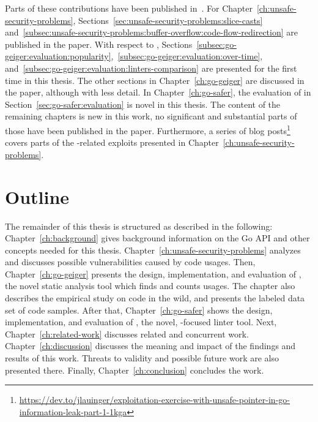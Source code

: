 Parts of these contributions have been published in~\cite{lauinger2020}.
For Chapter~\ref{ch:unsafe-security-problems}, Sections~\ref{sec:unsafe-security-problems:slice-casts}
and~\ref{subsec:unsafe-security-problems:buffer-overflow:code-flow-redirection} are published in the paper.
With respect to \toolGeiger{}, Sections~\ref{subsec:go-geiger:evaluation:popularity},~\ref{subsec:go-geiger:evaluation:over-time},
and~\ref{subsec:go-geiger:evaluation:linters-comparison} are presented for
the first time in this thesis.
The other sections in Chapter~\ref{ch:go-geiger} are discussed in the paper, although with less detail.
In Chapter~\ref{ch:go-safer}, the evaluation of \toolSafer{} in Section~\ref{sec:go-safer:evaluation} is novel in this
thesis.
The content of the remaining chapters is new in this work, no significant and substantial parts of those have been
published in the paper.
Furthermore, a series of blog
posts\footnote{\url{https://dev.to/jlauinger/exploitation-exercise-with-unsafe-pointer-in-go-information-leak-part-1-1kga}}
covers parts of the \unsafe{}-related exploits presented in Chapter~\ref{ch:unsafe-security-problems}.



\section{Outline}\label{sec:introduction:outline}

The remainder of this thesis is structured as described in the following: Chapter~\ref{ch:background} gives background
information on the Go \unsafe{} \acrshort{API} and other concepts needed for this thesis.
Chapter~\ref{ch:unsafe-security-problems} analyzes and discusses possible vulnerabilities caused by \unsafe{} code
usages.
Then, Chapter~\ref{ch:go-geiger} presents the design, implementation, and evaluation of \toolGeiger, the novel static
analysis tool which finds and counts \unsafe{} usages.
The chapter also describes the empirical study on \unsafe{} code in the wild, and presents the labeled data set of
\unsafe{} code samples.
After that, Chapter~\ref{ch:go-safer} shows the design, implementation, and evaluation of \toolSafer, the novel,
\unsafe{}-focused linter tool.
Next, Chapter~\ref{ch:related-work} discusses related and concurrent work.
Chapter~\ref{ch:discussion} discusses the meaning and impact of the findings and results of this work.
Threats to validity and possible future work are also presented there.
Finally, Chapter~\ref{ch:conclusion} concludes the work.
